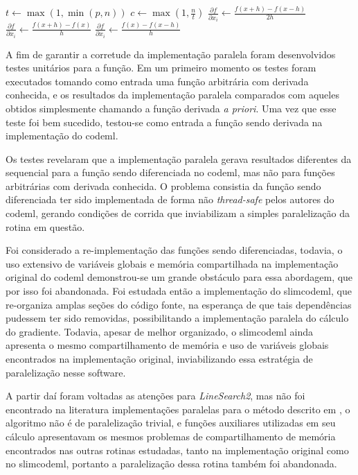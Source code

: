 \documentclass[cic,tc]{iiufrgs}
\begin{document}
\begin{algorithmic}
\State $t \gets \max(1, \min(p, n))$
\State $c \gets \max(1, \frac{n}{t})$
    \State $\frac{\partial f}{\partial x_i} \gets \frac{f(x+h)-f(x-h)}{2h}$
    \State $\frac{\partial f}{\partial x_i} \gets \frac{f(x+h)-f(x)}{h}$
  \Else
    \State $\frac{\partial f}{\partial x_i} \gets \frac{f(x)-f(x-h)}{h}$
  \EndIf
\EndFor
\end{algorithmic}

A fim de garantir a corretude da implementação paralela foram desenvolvidos
testes unitários para a função. Em um primeiro momento os testes foram
executados tomando como entrada uma função arbitrária com derivada conhecida,
e os resultados da implementação paralela comparados com aqueles obtidos
simplesmente chamando a função derivada \textit{a priori}. Uma vez que esse
teste foi bem sucedido, testou-se como entrada a função sendo derivada na
implementação do codeml.

Os testes revelaram que a implementação paralela gerava resultados diferentes
da sequencial para a função sendo diferenciada no codeml, mas não para funções
arbitrárias com derivada conhecida. O problema consistia da função sendo
diferenciada ter sido implementada de forma não \textit{thread-safe} pelos
autores do codeml, gerando condições de corrida que inviabilizam a simples
paralelização da rotina em questão.

Foi considerado a re-implementação das funções sendo diferenciadas, todavia, o
uso extensivo de variáveis globais e memória compartilhada na implementação
original do codeml demonstrou-se um grande obstáculo para essa abordagem, que
por isso foi abandonada. Foi estudada então a implementação do slimcodeml, que
re-organiza amplas seções do código fonte, na esperança de que tais
dependências pudessem ter sido removidas, possibilitando a implementação
paralela do cálculo do gradiente. Todavia, apesar de melhor organizado, o
slimcodeml ainda apresenta o mesmo compartilhamento de memória e uso de
variáveis globais encontrados na implementação original, inviabilizando essa
estratégia de paralelização nesse software.

A partir daí foram voltadas as atenções para \textit{LineSearch2}, mas não foi
encontrado na literatura implementações paralelas para o método descrito em
\cite{wolfe1978numerical}, o algoritmo não é de paralelização trivial, e
funções auxiliares utilizadas em seu cálculo apresentavam os mesmos problemas
de compartilhamento de memória encontrados nas outras rotinas estudadas, tanto
na implementação original como no slimcodeml, portanto a paralelização dessa
rotina também foi abandonada.
\end{document}
